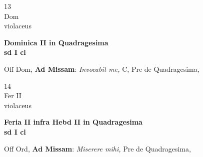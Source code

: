\documentclass[10pt, openany]{book}
\begin{document}
        \begin{center}
            \begin{minipage}{3.5in}
                \vspace{2em}
                \begin{minipage}{0.5in}
                    {\Huge 13} \\
                    {\normalsize Dom} \\
                    {\normalsize violaceus}
                \end{minipage}
                \begin{minipage}{3.0in}
                    \textbf{ \large Dominica II in Quadragesima \\
                    \textnormal{\normalsize sd I cl}} \\ 
                \end{minipage}
                \begin{justify}Off Dom, \textbf{Ad Missam}: \textit{Invocabit me,} C, Pre de Quadragesima,   
                \end{justify}
            \end{minipage}
        \end{center}
    
        \begin{center}
            \begin{minipage}{3.5in}
                \vspace{2em}
                \begin{minipage}{0.5in}
                    {\Huge 14} \\
                    {\normalsize Fer II} \\
                    {\normalsize violaceus}
                \end{minipage}
                \begin{minipage}{3.0in}
                    \textbf{ \large Feria II infra Hebd II in Quadragesima \\
                    \textnormal{\normalsize sd I cl}} \\ 
                \end{minipage}
                \begin{justify}Off Ord, \textbf{Ad Missam}: \textit{Miserere mihi,} Pre de Quadragesima,   
                \end{justify}
            \end{minipage}
        \end{center}
    
\end{document}
